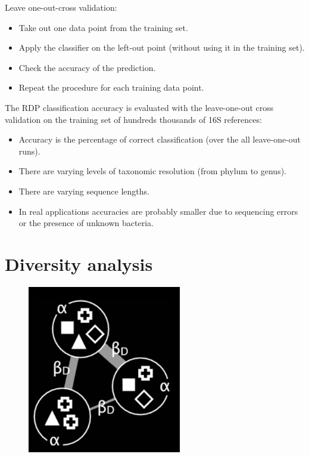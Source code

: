     Leave one-out-cross validation:

    \begin{multicols}{2}
      \begin{itemize}
          \item Take out one data point from the training set.
          \item Apply the classifier on the left-out point (without using it in the training set).
          \item Check the accuracy of the prediction.
          \item Repeat the procedure for each training data point.
      \end{itemize}
    \end{multicols}

    The RDP classification accuracy is evaluated with the leave-one-out cross validation on the training set of hundreds thousands of 16S references:

    \begin{multicols}{2}
      \begin{itemize}
          \item Accuracy is the percentage of correct classification (over the all leave-one-out runs).
          \item There are varying levels of taxonomic resolution (from phylum to genus).
          \item There are varying sequence lengths.
          \item In real applications accuracies are probably smaller due to sequencing errors or the presence of unknown bacteria.
      \end{itemize}
    \end{multicols}

\section{Diversity analysis}

\begin{figure}[h]
  \centering
  \includegraphics[width=0.6\textwidth]{Diversity.png}
  \caption{}
\end{figure}

